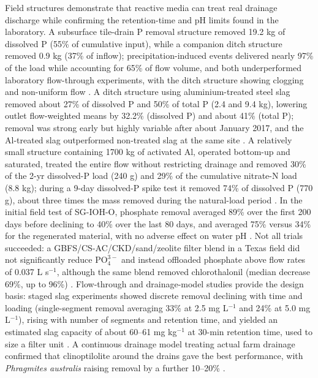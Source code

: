 \documentclass[11pt]{article}
\begin{document}
Field structures demonstrate that reactive media can treat real drainage discharge while confirming the retention-time and pH limits found in the laboratory. A subsurface tile-drain P removal structure removed 19.2 kg of dissolved P (55\% of cumulative input), while a companion ditch structure removed 0.9 kg (37\% of inflow); precipitation-induced events delivered nearly 97\% of the load while accounting for 65\% of flow volume, and both underperformed laboratory flow-through experiments, with the ditch structure showing clogging and non-uniform flow \parencite{Penn2020}. A ditch structure using aluminium-treated steel slag removed about 27\% of dissolved P and 50\% of total P (2.4 and 9.4 kg), lowering outlet flow-weighted means by 32.2\% (dissolved P) and about 41\% (total P); removal was strong early but highly variable after about January 2017, and the Al-treated slag outperformed non-treated slag at the same site \parencite{Shedekar2020}. A relatively small structure containing 1700 kg of activated Al, operated bottom-up and saturated, treated the entire flow without restricting drainage and removed 30\% of the 2-yr dissolved-P load (240 g) and 29\% of the cumulative nitrate-N load (8.8 kg); during a 9-day dissolved-P spike test it removed 74\% of dissolved P (770 g), about three times the mass removed during the natural-load period \parencite{Penn2024}. In the initial field test of SG-IOH-O, phosphate removal averaged 89\% over the first 200 days before declining to 40\% over the last 80 days, and averaged 75\% versus 34\% for the regenerated material, with no adverse effect on water pH \parencite{Allred2017}. Not all trials succeeded: a GBFS/CS-AC/CKD/sand/zeolite filter blend in a Texas field did not significantly reduce $\mathrm{PO_4^{3-}}$ and instead offloaded phosphate above flow rates of 0.037 L s$^{-1}$, although the same blend removed chlorothalonil (median decrease 69\%, up to 96\%) \parencite{Agrawal2011b}. Flow-through and drainage-model studies provide the design basis: staged slag experiments showed discrete removal declining with time and loading (single-segment removal averaging 33\% at 2.5 mg L$^{-1}$ and 24\% at 5.0 mg L$^{-1}$), rising with number of segments and retention time, and yielded an estimated slag capacity of about 60--61 mg kg$^{-1}$ at 30-min retention time, used to size a filter unit \parencite{Wang2020d}. A continuous drainage model treating actual farm drainage confirmed that clinoptilolite around the drains gave the best performance, with \textit{Phragmites australis} raising removal by a further 10--20\% \parencite{Sadeghi2021}.
\end{document}

